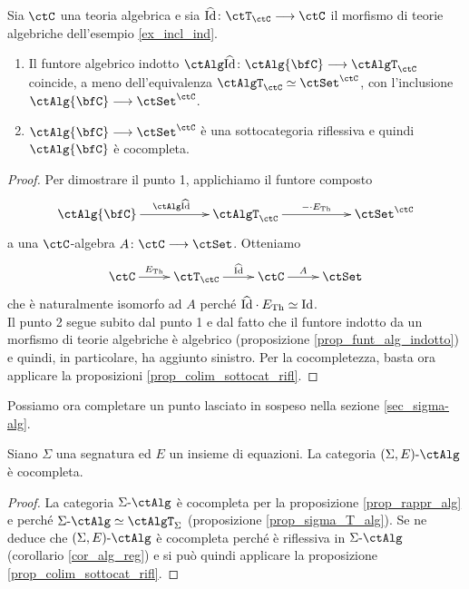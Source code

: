\begin{proposition}\label{prop_rappr_alg}
 Sia \(\ctC\) una teoria algebrica e sia \(\widehat{\mathrm{Id}} \colon \ctT_{\ctC} \fun \ctC\) il morfismo di teorie algebriche dell'esempio
 \ref{ex_incl_ind}.
 \begin{enumerate}
  \item Il funtore algebrico indotto \(\ctAlg \widehat{\mathrm{Id}} \colon \ctAlg{\bfC} \fun \ctAlgT_{\ctC}\) coincide, a meno dell'equivalenza
        \(\ctAlgT_{\ctC} \simeq \ctSet^{\ctC}\), con l'inclusione \(\ctAlg{\bfC} \fun \ctSet^{\ctC}\).
  \item \(\ctAlg{\bfC} \fun \ctSet^{\ctC}\) è una sottocategoria riflessiva e quindi \(\ctAlg{\bfC}\) è cocompleta.
 \end{enumerate}
\end{proposition}

\begin{proof}
 Per dimostrare il punto 1, applichiamo il funtore composto
 \[ \xymatrix{\ctAlg{\bfC} \ar[rr]^{\ctAlg \widehat{\mathrm{Id}}} & & \ctAlgT_{\ctC} \ar[rr]^-{- \cmp E_{\mathrm{Th}}} & & \ctSet^{\ctC} }\]
 a una \(\ctC\)-algebra \(A \colon \ctC \fun \ctSet\). Otteniamo
 \[ \xymatrix{\ctC \ar[r]^-{E_{\mathrm{Th}}} & \ctT_{\ctC} \ar[r]^-{\widehat{\mathrm{Id}}} & \ctC \ar[r]^-{A} & \ctSet }\]
 che è naturalmente isomorfo ad \(A\) perché  \(\widehat{\mathrm{Id}} \cdot E_{\mathrm{Th}} \simeq \mathrm{Id}\). \\
 Il punto 2 segue subito dal punto 1 e dal fatto che il funtore indotto da un morfismo di teorie algebriche è algebrico
 (proposizione \ref{prop_funt_alg_indotto}) e quindi, in particolare, ha aggiunto sinistro. Per la cocompletezza, basta
 ora applicare la proposizioni \ref{prop_colim_sottocat_rifl}.
\end{proof}

Possiamo ora completare un punto lasciato in sospeso nella sezione \ref{sec_sigma-alg}.

\begin{corollary}\label{cor__AlgT_SEAlg_cocompl}
 Siano \(\Sigma\) una segnatura ed \(E\) un insieme di equazioni. La categoria \(\ctSEAlg\) è cocompleta.
\end{corollary}

\begin{proof}
 La categoria \(\ctSAlg\) è cocompleta per la proposizione \ref{prop_rappr_alg} e perché \(\ctSAlg \simeq \ctAlgT_{\Sigma}\)
 (proposizione \ref{prop_sigma_T_alg}). Se ne deduce che \(\ctSEAlg\) è cocompleta perché è riflessiva in \(\ctSAlg\)
 (corollario \ref{cor_alg_reg}) e si può quindi applicare la proposizione \ref{prop_colim_sottocat_rifl}.
\end{proof}

